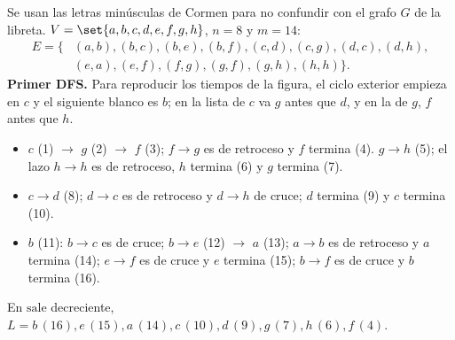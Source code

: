 \documentclass[11pt,letterpaper]{article}
\begin{document}
\begin{ejemplo}
  \label{ej:componentes-cormen}
  Se usan las letras minúsculas de Cormen para no confundir con el
  grafo $G$ de la libreta. $V = \set{a, b, c, d, e, f, g, h}$, $n = 8$
  y $m = 14$:
  \[
    \begin{aligned}
      E = \{&(a,b), (b,c), (b,e), (b,f), (c,d), (c,g), (d,c),
             (d,h), \\
            &(e,a), (e,f), (f,g), (g,f), (g,h), (h,h)\} .
    \end{aligned}
  \]
  \textbf{Primer DFS.} Para reproducir los tiempos de la figura, el
  ciclo exterior empieza en $c$ y el siguiente blanco es $b$; en la
  lista de $c$ va $g$ antes que $d$, y en la de $g$, $f$ antes que $h$.
  \begin{itemize}[itemsep=0.1em]
    \item $c$ (1) $\to$ $g$ (2) $\to$ $f$ (3); $f \to g$ es de
          retroceso y $f$ termina (4). $g \to h$ (5); el lazo
          $h \to h$ es de retroceso, $h$ termina (6) y $g$ termina (7).
    \item $c \to d$ (8); $d \to c$ es de retroceso y $d \to h$ de
          cruce; $d$ termina (9) y $c$ termina (10).
    \item $b$ (11): $b \to c$ es de cruce; $b \to e$ (12) $\to$ $a$
          (13); $a \to b$ es de retroceso y $a$ termina (14); $e \to f$
          es de cruce y $e$ termina (15); $b \to f$ es de cruce y $b$
          termina (16).
  \end{itemize}
  En $\text{sale}$ decreciente,
  $L = b\,(16), e\,(15), a\,(14), c\,(10), d\,(9), g\,(7), h\,(6),
  f\,(4)$.
  \begin{center}
\end{center}
\end{ejemplo}
\end{document}
